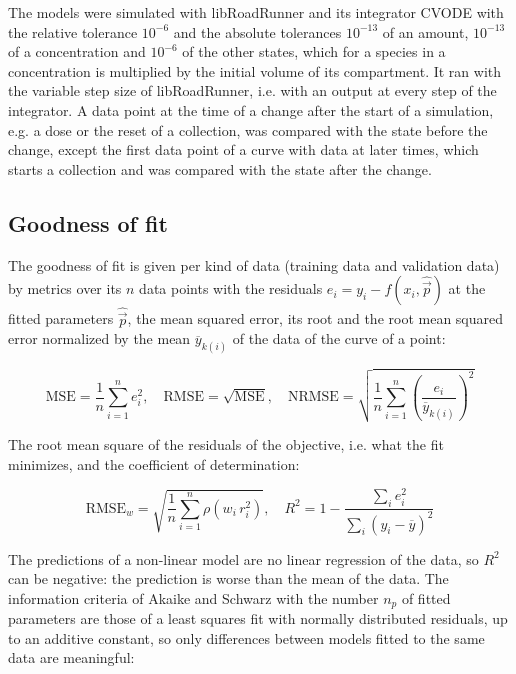 The models were simulated with libRoadRunner \cite{Welsh2023} and its integrator CVODE \cite{Hindmarsh2005} with the relative tolerance $10^{-6}$ and the absolute tolerances $10^{-13}$ of an amount, $10^{-13}$ of a concentration and $10^{-6}$ of the other states, which for a species in a concentration is multiplied by the initial volume of its compartment. It ran with the variable step size of libRoadRunner, i.e. with an output at every step of the integrator. A data point at the time of a change after the start of a simulation, e.g. a dose or the reset of a collection, was compared with the state before the change, except the first data point of a curve with data at later times, which starts a collection and was compared with the state after the change.

\subsection{Goodness of fit}

The goodness of fit is given per kind of data (training data and validation data) by metrics over its $n$ data points with the residuals $e_i = y_i - f(x_i, \hat{\vec{p}})$ at the fitted parameters $\hat{\vec{p}}$, the mean squared error, its root and the root mean squared error normalized by the mean $\overline{y}_{k(i)}$ of the data of the curve of a point:

\begin{equation}
\mathrm{MSE} = \frac{1}{n} \sum_{i=1}^{n} e_i^2, \quad \mathrm{RMSE} = \sqrt{\mathrm{MSE}}, \quad \mathrm{NRMSE} = \sqrt{\frac{1}{n} \sum_{i=1}^{n} \left(\frac{e_i}{\overline{y}_{k(i)}}\right)^2}
\end{equation}

The root mean square of the residuals of the objective, i.e. what the fit minimizes, and the coefficient of determination:

\begin{equation}
\mathrm{RMSE}_w = \sqrt{\frac{1}{n} \sum_{i=1}^{n} \rho\left(w_i\, r_i^2\right)}, \quad R^2 = 1 - \frac{\sum_{i} e_i^2}{\sum_{i} \left(y_i - \overline{y}\right)^2}
\end{equation}

The predictions of a non-linear model are no linear regression of the data, so $R^2$ can be negative: the prediction is worse than the mean of the data. The information criteria of Akaike \cite{Akaike1974} and Schwarz \cite{Schwarz1978} with the number $n_p$ of fitted parameters are those of a least squares fit with normally distributed residuals, up to an additive constant, so only differences between models fitted to the same data are meaningful:


